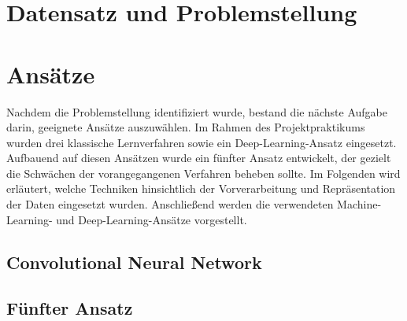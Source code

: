 \documentclass[researchlab,palatino]{AIGpaper}
\begin{document}
\section{Datensatz und Problemstellung}
\label{Datensatz}


\section{Ansätze}
\label{sec:Ansaetze}
Nachdem die Problemstellung identifiziert wurde, bestand die nächste Aufgabe darin, geeignete Ansätze auszuwählen. Im Rahmen des Projektpraktikums wurden drei klassische Lernverfahren sowie ein Deep-Learning-Ansatz eingesetzt. Aufbauend auf diesen Ansätzen wurde ein fünfter Ansatz entwickelt, der gezielt die Schwächen der vorangegangenen Verfahren beheben sollte. Im Folgenden wird erläutert, welche Techniken hinsichtlich der Vorverarbeitung und Repräsentation der Daten eingesetzt wurden. Anschließend werden die verwendeten Machine-Learning- und Deep-Learning-Ansätze vorgestellt.









\subsection{Convolutional Neural Network}
\label{CNN}


\subsection{Fünfter Ansatz}
\label{Transformer}



% 


\label{Experimente}





\newpage
\addreferences

\end{document}
